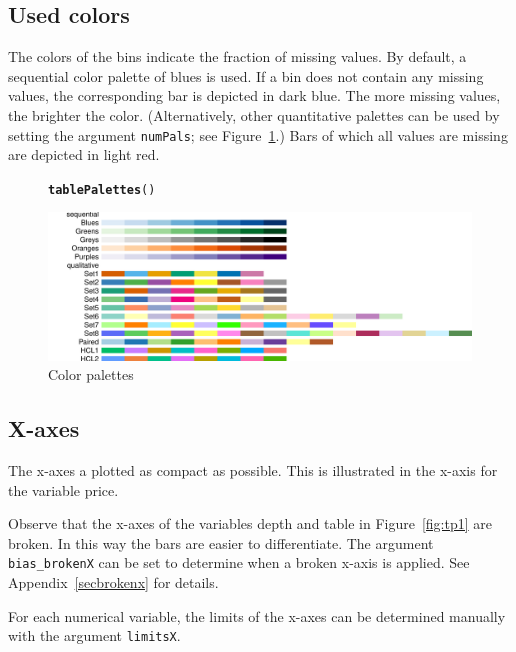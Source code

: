\documentclass[11pt, fleqn, a4paper]{article}\usepackage{graphicx, color}
\makeatletter
\def\maxwidth{ %
  \ifdim\Gin@nat@width>\linewidth
    \linewidth
  \else
    \Gin@nat@width
  \fi
}
\newcommand{\hlfunctioncall}[1]{\textcolor[rgb]{0.501960784313725,0,0.329411764705882}{\textbf{#1}}}%
\newenvironment{kframe}{%
 \def\at@end@of@kframe{}%
 \ifinner\ifhmode%
  \def\at@end@of@kframe{\end{minipage}}%
  \begin{minipage}{\columnwidth}%
 \fi\fi%
 \def\FrameCommand##1{\hskip\@totalleftmargin \hskip-\fboxsep
 \colorbox{shadecolor}{##1}\hskip-\fboxsep
     \hskip-\linewidth \hskip-\@totalleftmargin \hskip\columnwidth}%
 \MakeFramed {\advance\hsize-\width
   \@totalleftmargin\z@ \linewidth\hsize
   \@setminipage}}%
 {\par\unskip\endMakeFramed%
 \at@end@of@kframe}
\newenvironment{knitrout}{}{} %
\makeatother
\begin{document}
\subsection{Used colors}
The colors of the bins indicate the fraction of missing values. By default, a sequential color palette of blues is used. If a bin does not contain any missing values, the corresponding bar is depicted in dark blue. The more missing values, the brighter the color. (Alternatively, other quantitative palettes can be used by setting the argument {\tt numPals}; see Figure~\ref{fig:pals}.) Bars of which all values are missing are depicted in light red.

\begin{figure}[htp]
\begin{knitrout}
\color{fgcolor}\begin{kframe}
\begin{alltt}
\hlfunctioncall{tablePalettes}()
\end{alltt}
\end{kframe}
\includegraphics[width=\maxwidth]{figure/chunk6} 

\end{knitrout}

\caption{Color palettes}
\label{fig:pals}
\end{figure}


\subsection{X-axes}

The x-axes a plotted as compact as possible. This is illustrated in the x-axis for the variable price.

Observe that the x-axes of the variables depth and table in Figure~\ref{fig:tp1} are broken. In this way the bars are easier to differentiate. The argument {\tt bias\_brokenX} can be set to determine when a broken x-axis is applied. See Appendix~\ref{secbrokenx} for details.

For each numerical variable, the limits of the x-axes can be determined manually with the argument {\tt limitsX}.
\end{document}
